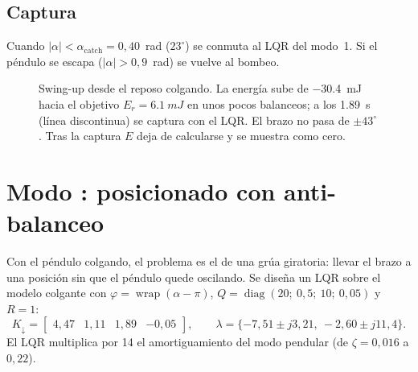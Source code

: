 \subsection{Captura}
Cuando $|\alpha|<\alpha_{\text{catch}}=0{,}40$~rad ($23^\circ$) se conmuta al LQR del modo~1. Si el péndulo se escapa ($|\alpha|>0{,}9$~rad) se vuelve al bombeo.

\begin{figure}[H]
\centering
{}
\caption{Swing-up desde el reposo colgando. La energía sube de \SI{-30.4}{mJ} hacia el objetivo $E_r=\SI{6.1}{mJ}$ en unos pocos balanceos; a los \SI{1.89}{s} (línea discontinua) se captura con el LQR. El brazo no pasa de $\pm43^\circ$. Tras la captura $E$ deja de calcularse y se muestra como cero.}
\label{fig:swingup}
\end{figure}

\section{Modo : posicionado con anti-balanceo}

Con el péndulo colgando, el problema es el de una grúa giratoria: llevar el brazo a una posición sin que el péndulo quede oscilando. Se diseña un LQR sobre el modelo colgante con $\varphi=\operatorname{wrap}(\alpha-\pi)$, $Q=\operatorname{diag}(20;\ 0{,}5;\ 10;\ 0{,}05)$ y $R=1$:
\[
K_\downarrow=\begin{bmatrix}4{,}47 & 1{,}11 & 1{,}89 & -0{,}05\end{bmatrix},\qquad
\lambda=\{-7{,}51\pm j3{,}21,\ -2{,}60\pm j11{,}4\}.
\]
El LQR multiplica por 14 el amortiguamiento del modo pendular (de $\zeta=0{,}016$ a $0{,}22$).

